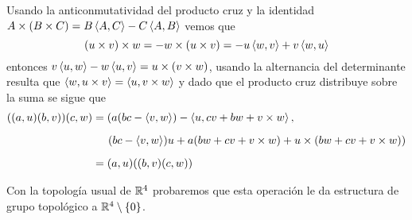 \documentclass{article}
\begin{document}
Usando la anticonmutatividad del producto cruz y la identidad $A\times(B\times C)
=B\left\langle{A},{C}\right\rangle-C\left\langle{A},{B}\right\rangle$ vemos que
\begin{equation*}
    (u\times v)\times w=-w\times(u\times v)=-u\left\langle{w},{v}\right\rangle+v\left\langle{w},{u}\right\rangle
\end{equation*}
entonces $v\left\langle{u},{w}\right\rangle-w\left\langle{u},{v}\right\rangle=u\times(v\times w)$, usando la alternancia del determinante 
resulta que $\left\langle{w},{u\times v}\right\rangle=\left\langle{u},{v\times w}\right\rangle$ y dado que el producto cruz distribuye sobre la
suma se sigue que
\begin{align*}
    ((a,u)(b,v))(c,w) &= (a(bc-\left\langle{v},{w}\right\rangle)-\left\langle{u},{cv+bw+v\times w}\right\rangle, \\[2mm]
    &\hspace{5mm}(bc-\left\langle{v},{w}\right\rangle)u+a(bw+cv+v\times w)+u\times(bw+cv+v\times w)) \\[2mm]
    &= (a,u)((b,v)(c,w))
\end{align*}

\noindent Con la topología usual de $\mathbb{R}^{4}$ probaremos que esta operación le da estructura de 
grupo topológico a $\mathbb{R}^{4}\setminus\{0\}$.

\end{document}
